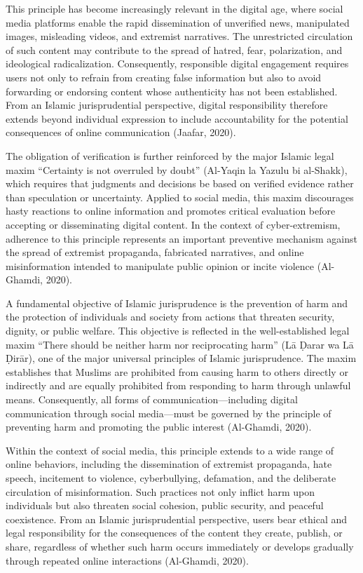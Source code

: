 \documentclass[10pt]{NSP1}
\begin{document}
This principle has become increasingly relevant in the digital age, where social media platforms enable the rapid dissemination of unverified news, manipulated images, misleading videos, and extremist narratives. The unrestricted circulation of such content may contribute to the spread of hatred, fear, polarization, and ideological radicalization. Consequently, responsible digital engagement requires users not only to refrain from creating false information but also to avoid forwarding or endorsing content whose authenticity has not been established. From an Islamic jurisprudential perspective, digital responsibility therefore extends beyond individual expression to include accountability for the potential consequences of online communication (Jaafar, 2020).

The obligation of verification is further reinforced by the major Islamic legal maxim “Certainty is not overruled by doubt” (Al-Yaqin la Yazulu bi al-Shakk), which requires that judgments and decisions be based on verified evidence rather than speculation or uncertainty. Applied to social media, this maxim discourages hasty reactions to online information and promotes critical evaluation before accepting or disseminating digital content. In the context of cyber-extremism, adherence to this principle represents an important preventive mechanism against the spread of extremist propaganda, fabricated narratives, and online misinformation intended to manipulate public opinion or incite violence (Al-Ghamdi, 2020).

\par\medskip{}\smallskip

A fundamental objective of Islamic jurisprudence is the prevention of harm and the protection of individuals and society from actions that threaten security, dignity, or public welfare. This objective is reflected in the well-established legal maxim “There should be neither harm nor reciprocating harm” (Lā Ḍarar wa Lā Ḍirār), one of the major universal principles of Islamic jurisprudence. The maxim establishes that Muslims are prohibited from causing harm to others directly or indirectly and are equally prohibited from responding to harm through unlawful means. Consequently, all forms of communication—including digital communication through social media—must be governed by the principle of preventing harm and promoting the public interest (Al-Ghamdi, 2020).

Within the context of social media, this principle extends to a wide range of online behaviors, including the dissemination of extremist propaganda, hate speech, incitement to violence, cyberbullying, defamation, and the deliberate circulation of misinformation. Such practices not only inflict harm upon individuals but also threaten social cohesion, public security, and peaceful coexistence. From an Islamic jurisprudential perspective, users bear ethical and legal responsibility for the consequences of the content they create, publish, or share, regardless of whether such harm occurs immediately or develops gradually through repeated online interactions (Al-Ghamdi, 2020).
\end{document}
